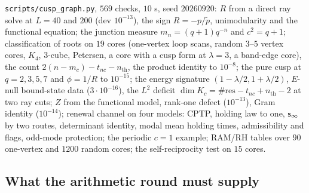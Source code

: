 \begin{numerical}
\label{num:cusp-graph}
\texttt{scripts/cusp\_graph.py}, $569$ checks, $10$ s, seed $20260920$: $R$ from a direct ray solve at
$L = 40$ and $200$ (dev $10^{-13}$), the sign $R = -p/\tilde p$, unimodularity and the functional equation;
the junction measure $m_n = (q+1)q^{-n}$ and $c^2 = q+1$; classification of roots on $19$ cores (one-vertex
loop scans, random $3$--$5$ vertex cores, $K_4$, $3$-cube, Petersen, a core with a cusp form at $\lambda = 3$,
a band-edge core), the count $2(n-m_c)-t_{nc}-n_{\mathrm{th}}$, the product identity to $10^{-8}$; the pure cusp at
$q = 2,3,5,7$ and $\phi = 1/R$ to $10^{-15}$; the energy signature $(1-\lambda/2,1+\lambda/2)$, $E$-null
bound-state data ($3\cdot10^{-16}$), the $L^2$ deficit $\dim K_c = \#\mathrm{res}-t_{nc}+n_{\mathrm{th}}-2$ at two
ray cuts; $Z$ from the functional model, rank-one defect ($10^{-13}$), Gram identity ($10^{-14}$); renewal
channel on four models: CPTP, holding law to one, $\mathsf s_\infty$ by two routes, determinant identity, modal
mean holding times, admissibility and flags, odd-mode protection; the periodic $c = 1$ example; RAM/RH tables over
$90$ one-vertex and $1200$ random cores; the self-reciprocity test on $15$ cores.
\end{numerical}

\subsection{What the arithmetic round must supply}

